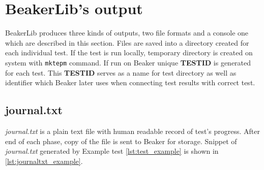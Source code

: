 \section{BeakerLib's output}
BeakerLib produces three kinds of outputs, two file formats and a console one which are described in this section. Files are saved into a directory created for each individual test. If the test is run locally, temporary directory is created on system with \texttt{mktepm} command. If run on Beaker unique \textbf{TESTID} is generated for each test. This \textbf{TESTID} serves as a name for test directory as well as identifier which Beaker later uses when connecting test results with correct test.

\subsection{journal.txt}
\textit{journal.txt} is a plain text file with human readable record of test's progress. After end of each phase, copy of the file is sent to Beaker for storage. Snippet of \textit{journal.txt} generated by Example test \ref{lst:test_example} is shown in \ref{lst:journaltxt_example}.



